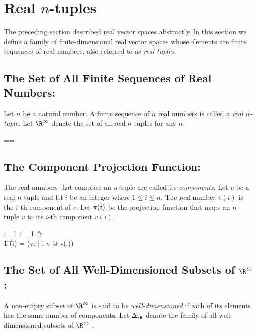 \documentclass{amsart}
\begin{document}
\section{Real $n$-tuples}

The preceding section described real vector spaces abstractly.
In this section we define a family of finite-dimensional real vector spaces
whose elements are finite sequences of real numbers, also referred to as \textit{real tuples}.

\subsection{The Set of All Finite Sequences of Real Numbers: }

Let $n$ be a natural number.
A finite sequence of $n$ real numbers is called a {\it real $n$-tuple}.
Let $\Rinf$ denote the set of all real $n$-tuples for any $n$.

\begin{zed}
	\Rinf == \seq \R
\end{zed}

\subsection{The Component Projection Function: }

The real numbers that comprise an $n$-tuple are called its \textit{components}.
Let $v$ be a real $n$-tuple and let $i$ be an integer where $1 \le i \le n$.
The real number $v(i)$ is the $i$-th component of $v$.
Let $\operatorname{\pi}(i)$ be the projection function that maps an $n$-tuple $v$ to its $i$-th component $v(i)$.

\begin{axdef}
	\piRinf: \nat_1 \fun \Rinf \pfun \R
\where
	\forall i: \nat_1 @ \\
	\t1	\piRinf(i) = (\lambda v: \Rinf | i \in \dom v @ v(i))
\end{axdef}

\subsection{The Set of All Well-Dimensioned Subsets of $\Rinf$: }

A non-empty subset of $\Rinf$ is said to be \textit{well-dimensioned} if each of its elements has the same number
of components.
Let $\DeltaRinf$ denote the family of all well-dimensioned subsets of $\Rinf$ .
\end{document}
